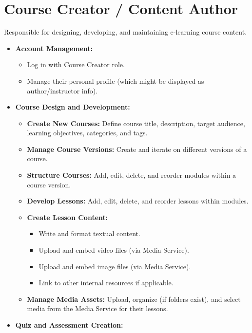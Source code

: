 \documentclass[12pt, a4paper]{report} %
\begin{document}
\section{Course Creator / Content Author}
Responsible for designing, developing, and maintaining e-learning course content.
  \begin{itemize}
    \item \textbf{Account Management:}
        \begin{itemize}
            \item Log in with Course Creator role.
            \item Manage their personal profile (which might be displayed as author/instructor info).
        \end{itemize}
    \item \textbf{Course Design and Development:}
        \begin{itemize}
            \item \textbf{Create New Courses:} Define course title, description, target audience, learning objectives, categories, and tags.
            \item \textbf{Manage Course Versions:} Create and iterate on different versions of a course.
            \item \textbf{Structure Courses:} Add, edit, delete, and reorder modules within a course version.
            \item \textbf{Develop Lessons:} Add, edit, delete, and reorder lessons within modules.
            \item \textbf{Create Lesson Content:}
                \begin{itemize}
                    \item Write and format textual content.
                    \item Upload and embed video files (via Media Service).
                    \item Upload and embed image files (via Media Service).
                    \item Link to other internal resources if applicable.
                \end{itemize}
            \item \textbf{Manage Media Assets:} Upload, organize (if folders exist), and select media from the Media Service for their lessons.
        \end{itemize}
    \item \textbf{Quiz and Assessment Creation:}
        \begin{itemize}

\end{itemize}
\end{itemize}
\end{document}
